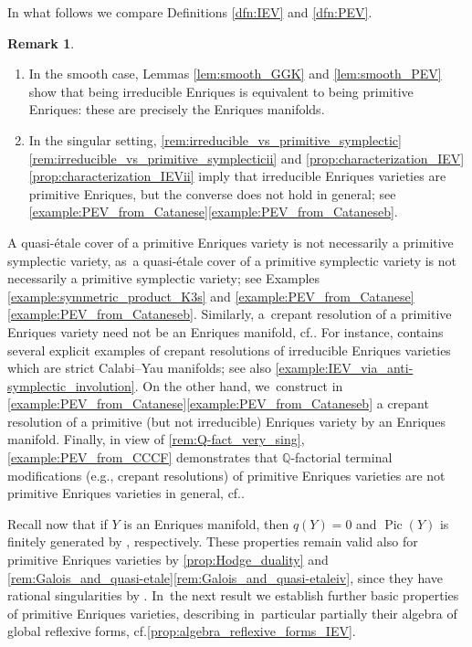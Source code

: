 \documentclass[10pt]{amsart}
\newcommand{\cf}{cf.}
\newcommand{\skpt}{\par\smallskip\noindent}
\theoremstyle{plain}
\theoremstyle{definition}
\newtheorem{rem}[thm]{Remark}
\newcommand{\Q}{\mathbb{Q}}
\DeclareMathOperator{\Pic}{Pic}
\begin{document}
In what follows we compare Definitions \ref{dfn:IEV} and \ref{dfn:PEV}.

\skpt
\begin{rem}
\label{rem:irreducible_vs_primitive_Enriques}
\begin{enumerate}
\item
In the smooth case, Lemmas \ref{lem:smooth_GGK} and \ref{lem:smooth_PEV} show that being irreducible Enriques is equivalent to being primitive Enriques: these are precisely the Enriques manifolds.

\item
In the singular setting, \autoref{rem:irreducible_vs_primitive_symplectic}\eqref{rem:irreducible_vs_primitive_symplecticii} and \autoref{prop:characterization_IEV}\eqref{prop:characterization_IEVii} imply that irreducible Enriques varieties are primitive Enriques, but the converse does not hold in general; see \autoref{example:PEV_from_Catanese}\eqref{example:PEV_from_Cataneseb}.
\end{enumerate}
\end{rem}

A quasi-étale cover of a primitive Enriques variety is not necessarily a primitive symplectic variety, as~a quasi-étale cover of a primitive symplectic variety is not necessarily a primitive symplectic variety; see Examples \ref{example:symmetric_product_K3s} and \ref{example:PEV_from_Catanese}\eqref{example:PEV_from_Cataneseb}.
Similarly, a~crepant resolution of a primitive Enriques variety need not be an Enriques manifold, \cf \cite[Rem.\,3.3(2)]{BL21}. For instance, \cite[\S 4]{CGM19} contains several explicit examples of crepant resolutions of irreducible Enriques varieties which are strict Calabi--Yau manifolds; see also \autoref{example:IEV_via_anti-symplectic_involution}.
On the other hand, we~construct in \autoref{example:PEV_from_Catanese}\eqref{example:PEV_from_Cataneseb} a crepant resolution of a primitive (but not irreducible) Enriques variety by an Enriques manifold.
Finally, in view of \autoref{rem:Q-fact_very_sing}, \autoref{example:PEV_from_CCCF} demonstrates that $\Q$\nobreakdash-factorial terminal modifications (e.g., crepant resolutions) of primitive Enriques varieties are not primitive Enriques varieties in general, \cf \cite[Prop.\,11]{Schwald20}.

Recall now that if $Y$ is an Enriques manifold, then $q(Y) = 0$ and $\Pic(Y)$ is finitely generated by \cite[Prop.\,2.6 \& Prop.\,2.8]{OS11a}, respectively. These properties remain valid also for primitive Enriques varieties by \autoref{prop:Hodge_duality} and \autoref{rem:Galois_and_quasi-etale}\eqref{rem:Galois_and_quasi-etaleiv}, since they have rational singularities by \cite[Th.\,5.22]{KM98}. In~the next result we establish further basic properties of primitive Enriques varieties, describing in~particular partially their algebra of global reflexive forms, \cf \autoref{prop:algebra_reflexive_forms_IEV}.
\end{document}
